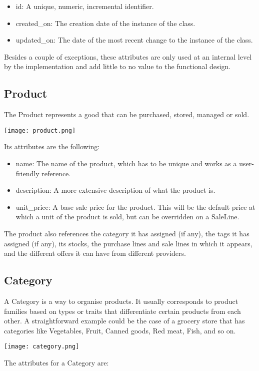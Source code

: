 \begin{itemize}
\item id: A unique, numeric, incremental identifier.
\item created\_on: The creation date of the instance of the class.
\item updated\_on: The date of the most recent change to the instance of the class.
\end{itemize}

Besides a couple of exceptions, these attributes are only used at an internal level by the implementation and add little to no value to the functional design.

\subsection{Product}
The Product represents a good that can be purchased, stored, managed or sold. 
\begin{center}
\texttt{[image: product.png]}
\end{center}
Its attributes are the following:

\begin{itemize}
\item name: The name of the product, which has to be unique and works as a user-friendly reference.
\item description: A more extensive description of what the product is.
\item unit\_price: A base sale price for the product. This will be the default price at which a unit of the product is sold, but can be overridden on a SaleLine.
\end{itemize}

The product also references the category it has assigned (if any), the tags it has assigned (if any), its stocks, the purchase lines and sale lines in which it appears, and the different offers it can have from different providers.

\subsection{Category}
A Category is a way to organise products. It usually corresponds to product families based on types or traits that differentiate certain products from each other. A straightforward example could be the case of a grocery store that has categories like Vegetables, Fruit, Canned goods, Red meat, Fish, and so on. 
\begin{center}
\texttt{[image: category.png]}
\end{center}
The attributes for a Category are:

